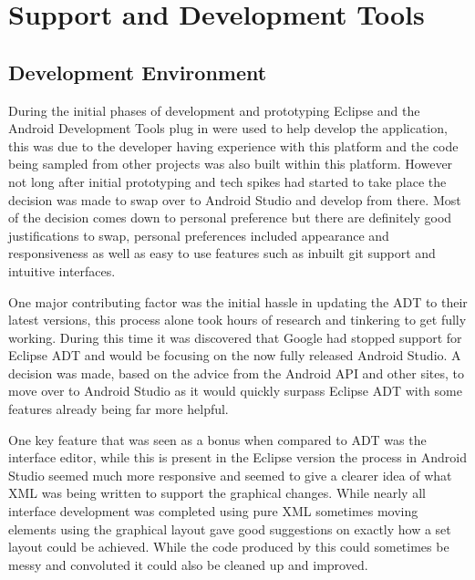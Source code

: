 \section{Support and Development Tools}
\subsection{Development Environment}
During the initial phases of development and prototyping Eclipse and the Android Development Tools plug in were used to help develop the application, this was due to the developer having experience with this platform and the code being sampled from other projects was also built within this platform. However not long after initial prototyping and tech spikes had started to take place the decision was made to swap over to Android Studio and develop from there. Most of the decision comes down to personal preference but there are definitely good justifications to swap, personal preferences included appearance and responsiveness as well as easy to use features such as inbuilt git support and intuitive interfaces. 

One major contributing factor was the initial hassle in updating the ADT to their latest versions, this process alone took hours of research and tinkering to get fully working. During this time it was discovered that Google had stopped support for Eclipse ADT and would be focusing on the now fully released Android Studio. A decision was made, based on the advice from the Android API and other sites, to move over to Android Studio as it would quickly surpass Eclipse ADT with some features already being far more helpful.

One key feature that was seen as a bonus when compared to ADT was the interface editor, while this is present in the Eclipse version the process in Android Studio seemed much more responsive and seemed to give a clearer idea of what XML was being written to support the graphical changes. While nearly all interface development was completed using pure XML sometimes moving elements using the graphical layout gave good suggestions on exactly how a set layout could be achieved. While the code produced by this could sometimes be messy and convoluted it could also be cleaned up and improved. 


